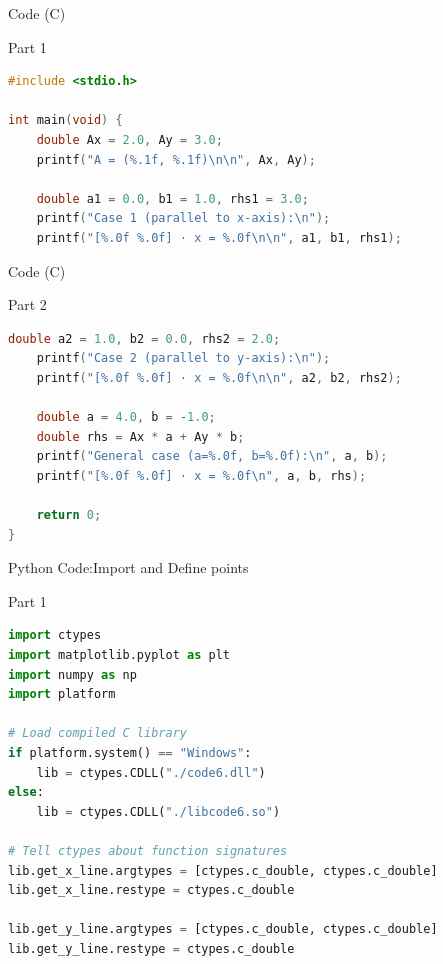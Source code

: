 \documentclass{beamer}
\begin{document}
\begin{frame}[fragile]{ Code (C)}
\begin{block}{Part 1}
\begin{lstlisting}[language=C, basicstyle=\ttfamily\small, keywordstyle=\color{blue}, frame=single]
#include <stdio.h>

int main(void) {
    double Ax = 2.0, Ay = 3.0;
    printf("A = (%.1f, %.1f)\n\n", Ax, Ay);

    double a1 = 0.0, b1 = 1.0, rhs1 = 3.0;
    printf("Case 1 (parallel to x-axis):\n");
    printf("[%.0f %.0f] · x = %.0f\n\n", a1, b1, rhs1);
\end{lstlisting}
\end{block}
\end{frame}

\begin{frame}[fragile]{ Code (C)}
\begin{block}{Part 2}
\begin{lstlisting}[language=C, basicstyle=\ttfamily\small, keywordstyle=\color{blue}, frame=single]
 double a2 = 1.0, b2 = 0.0, rhs2 = 2.0;
    printf("Case 2 (parallel to y-axis):\n");
    printf("[%.0f %.0f] · x = %.0f\n\n", a2, b2, rhs2);

    double a = 4.0, b = -1.0;
    double rhs = Ax * a + Ay * b;
    printf("General case (a=%.0f, b=%.0f):\n", a, b);
    printf("[%.0f %.0f] · x = %.0f\n", a, b, rhs);

    return 0;
}
\end{lstlisting}
\end{block}
\end{frame}



\begin{frame}[fragile]{Python Code:Import and Define points}
\begin{block}{Part 1}
\begin{lstlisting}[language=Python, basicstyle=\ttfamily\small, keywordstyle=\color{blue}, frame=single]
import ctypes
import matplotlib.pyplot as plt
import numpy as np
import platform

# Load compiled C library
if platform.system() == "Windows":
    lib = ctypes.CDLL("./code6.dll")
else:
    lib = ctypes.CDLL("./libcode6.so")

# Tell ctypes about function signatures
lib.get_x_line.argtypes = [ctypes.c_double, ctypes.c_double]
lib.get_x_line.restype = ctypes.c_double

lib.get_y_line.argtypes = [ctypes.c_double, ctypes.c_double]
lib.get_y_line.restype = ctypes.c_double

\end{lstlisting}
\end{block}
\end{frame}
\end{document}

